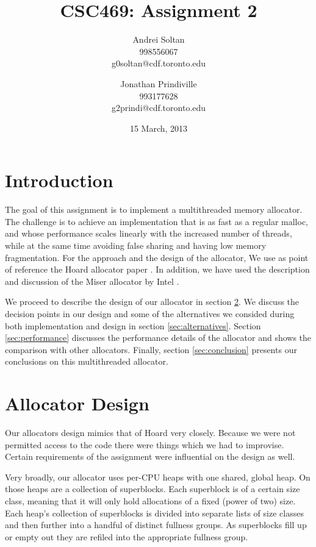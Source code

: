 \documentclass{article}
\author{Andrei Soltan\\998556067\\g0soltan@cdf.toronto.edu
\and Jonathan Prindiville\\993177628\\g2prindi@cdf.toronto.edu}
\title{CSC469: Assignment 2}
\date{15 March, 2013}
\begin{document}
\maketitle

\tableofcontents

\newpage
\section{Introduction}

The goal of this assignment is to implement a multithreaded memory allocator.
The challenge is to achieve an implementation that is as fast as a regular 
malloc, and whose performance scales linearly with the increased number of
threads, while at the same time avoiding false sharing and having low 
memory fragmentation. For the approach and the design of the allocator, 
We use as point of reference the Hoard allocator paper \cite{berger00}.
In addition, we have used the description and discussion of the Miser allocator
by Intel \cite{miser-intel}.

We proceed to describe the design of our allocator in section \ref{sec:design}. 
We discuss the decision points in our design and some of the alternatives we 
consided during both implementation and design in section \ref{sec:alternatives}.
Section \ref{sec:performance} discusses the performance details of the allocator
and shows the comparison with other allocators. Finally, section 
\ref{sec:conclusion} presents our conclusions on this multithreaded allocator.

\newpage
\section{Allocator Design}
\label{sec:design}

Our allocators design mimics that of Hoard \cite{berger00} very closely.
Because we were not permitted access to the code there were things which we
had to improvise. Certain requirements of the assignment were influential
on the design as well.

Very broadly, our allocator uses per-CPU heaps with one shared, global heap.
On those heaps are a collection of superblocks. Each superblock is of a
certain size class, meaning that it will only hold allocations of a fixed
(power of two) size. Each heap's collection of superblocks is divided into
separate lists of size classes and then further into a handful of distinct
fullness groups. As superblocks fill up or empty out they are refiled into
the appropriate fullness group.
\end{document}
